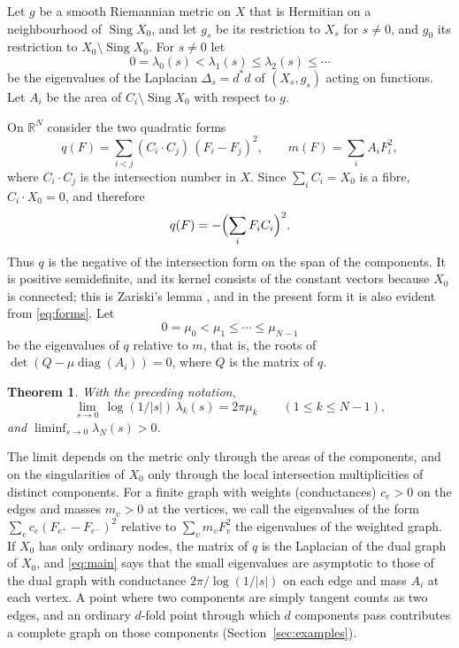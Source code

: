\documentclass[11pt]{amsart}
\newtheorem{theorem}{Theorem}[section]
\theoremstyle{definition}
\theoremstyle{remark}
\newcommand{\RR}{\mathbb R}
\newcommand{\Sing}{\operatorname{Sing}}
\begin{document}
Let $g$ be a smooth Riemannian metric on $X$ that is Hermitian on a
neighbourhood of $\Sing X_0$, and let $g_s$ be its restriction to $X_s$ for $s\ne0$, and $g_0$ its
restriction to $X_0\setminus\Sing X_0$.
For $s\ne0$ let
\[
 0=\lambda_0(s)<\lambda_1(s)\le\lambda_2(s)\le\cdots
\]
be the eigenvalues of the Laplacian $\Delta_s=d^*d$ of $(X_s,g_s)$ acting
on functions. Let $A_i$ be the area of $C_i\setminus\Sing X_0$ with respect
to $g$.

On $\RR^N$ consider the two quadratic forms
\begin{equation}\label{eq:forms}
 q(F)=\sum_{i<j}(C_i\cdot C_j)\,(F_i-F_j)^2,\qquad
 m(F)=\sum_{i}A_iF_i^2,
\end{equation}
where $C_i\cdot C_j$ is the intersection number in $X$. Since
$\sum_iC_i=X_0$ is a fibre, $C_i\cdot X_0=0$, and therefore
\begin{equation}\label{eq:q-intersection}
 q(F)=-\Bigl(\sum_iF_iC_i\Bigr)^2 .
\end{equation}
Thus $q$ is the negative of the intersection form on the span of the
components. It is positive semidefinite, and its kernel consists of the
constant vectors because $X_0$ is connected; this is Zariski's lemma
\cite[Chapter~III, Lemma~8.2]{bhpv}, and in the present form it is also
evident from \eqref{eq:forms}. Let
\[
 0=\mu_0<\mu_1\le\cdots\le\mu_{N-1}
\]
be the eigenvalues of $q$ relative to $m$, that is, the roots of
$\det(Q-\mu\operatorname{diag}(A_i))=0$, where $Q$ is the matrix of $q$.

\begin{theorem}\label{thm:main}
With the preceding notation,
\begin{equation}\label{eq:main}
 \lim_{s\to0}\,\log(1/|s|)\,\lambda_k(s)=2\pi\mu_k
 \qquad(1\le k\le N-1),
\end{equation}
and $\liminf_{s\to0}\lambda_N(s)>0$.
\end{theorem}

The limit depends on the metric only through the areas of the components,
and on the singularities of $X_0$ only through the local intersection
multiplicities of distinct components. For a finite graph with
weights (conductances) $c_e>0$ on the edges and masses $m_v>0$ at the
vertices, we call the eigenvalues of the form
$\sum_ec_e(F_{e^+}-F_{e^-})^2$ relative to $\sum_vm_vF_v^2$ the eigenvalues
of the weighted graph. If $X_0$ has only ordinary nodes,
the matrix of $q$ is the Laplacian of the dual graph of $X_0$, and
\eqref{eq:main} says that the small eigenvalues are asymptotic to those of
the dual graph with conductance $2\pi/\log(1/|s|)$ on each edge and mass
$A_i$ at each vertex. A point where two components are simply tangent
counts as two edges, and an ordinary $d$-fold point through which $d$
components pass contributes a complete graph on those components
(Section~\ref{sec:examples}).
\end{document}
